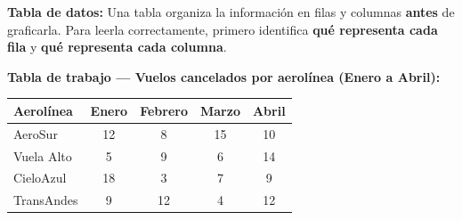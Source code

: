 \documentclass[12pt, letterpaper]{article}
\begin{document}
	\vspace{0.3cm}
	\begin{ejemplo}
		\textbf{Tabla de datos:} Una tabla organiza la información en filas
		y columnas \textbf{antes} de graficarla. Para leerla correctamente,
		primero identifica \textbf{qué representa cada fila} y \textbf{qué
			representa cada columna}.
	\end{ejemplo}
	\begin{center}
	\noindent\textbf{Tabla de trabajo — Vuelos cancelados por aerolínea
		(Enero a Abril):}
	\end{center}
	\renewcommand{\arraystretch}{1.7}
	\begin{center}
		\begin{tabular}{|l|c|c|c|c|}
			\hline
			\rowcolor{valblue!20}
			\textbf{Aerolínea} & \textbf{Enero} & \textbf{Febrero} &
			\textbf{Marzo} & \textbf{Abril} \\
			\hline
			AeroSur     & 12 & 8  & 15 & 10 \\
			\hline
			Vuela Alto  & 5  & 9  & 6  & 14 \\
			\hline
			CieloAzul   & 18 & 3  & 7  & 9  \\
			\hline
			TransAndes  & 9  & 12 & 4  & 12 \\
			\hline
		\end{tabular}
	\end{center}
	
\end{document}
